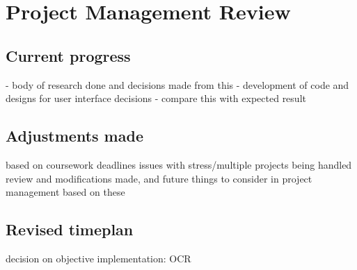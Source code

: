 \section{Project Management Review}
\subsection{Current progress}
- body of research done and decisions made from this
- development of code and designs for user interface decisions
- compare this with expected result

\subsection{Adjustments made}
based on coursework deadlines
issues with stress/multiple projects being handled
review and modifications made, and future things to consider in project management based on these

\subsection{Revised timeplan}
decision on objective implementation: OCR